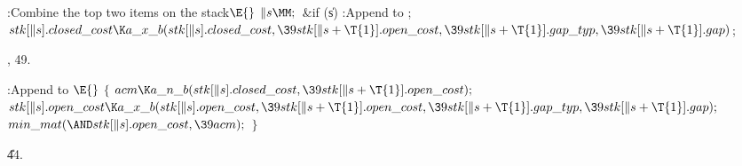 \B{}:Combine the top two items on the stack\X${}\E{}$\6
$\|s\MM;{}$\6
\&{if} (\|s)\1\5
:Append  to \X;\2\6
${}\\{stk}[\|s].\\{closed\_cost}\K\\{a\_x\_b}(\\{stk}[\|s].\\{closed\_cost},\39%
\\{stk}[\|s+\T{1}].\\{open\_cost},\39\\{stk}[\|s+\T{1}].\\{gap\_typ},\39%
\\{stk}[\|s+\T{1}].\\{gap}){}$;\par
{}, 49.\fi

\B{}:Append  to %
\X${}\E{}$\6
${}\{{}$\1\6
${}\\{acm}\K\\{a\_n\_b}(\\{stk}[\|s].\\{closed\_cost},\39\\{stk}[\|s+\T{1}].%
\\{open\_cost});{}$\6
${}\\{stk}[\|s].\\{open\_cost}\K\\{a\_x\_b}(\\{stk}[\|s].\\{open\_cost},\39%
\\{stk}[\|s+\T{1}].\\{open\_cost},\39\\{stk}[\|s+\T{1}].\\{gap\_typ},\39%
\\{stk}[\|s+\T{1}].\\{gap});{}$\6
${}\\{min\_mat}({\AND}\\{stk}[\|s].\\{open\_cost},\39\\{acm});{}$\6
\4${}\}{}$\2\par
\U44.\fi

